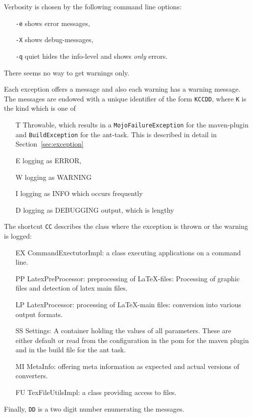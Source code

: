 Verbosity is chosen by the following command line options: 
%
\begin{itemize}
\item[\texttt{-e}] shows error messages, 
\item[\texttt{-X}] shows debug-messages, 
\item[\texttt{-q}] quiet hides the info-level and shows \emph{only} errors. 
\end{itemize}
%
There seems no way to get warnings only. 

Each exception offers a message and also each warning has a warning message. 
The messages are endowed with a unique identifier of the form 
\texttt{KCCDD}, where \texttt{K} is the kind which is one of 
%
\begin{itemize}
\item[T] Throwable, 
which results in a \texttt{MojoFailureException} for the maven-plugin 
and \texttt{BuildException} for the ant-task. 
This is described in detail in Section~\ref{sec:exception} 
\item[E] logging as ERROR, 
\item[W] logging as WARNING 
\item[I] logging as INFO which occurs frequently
\item[D] logging as DEBUGGING output, which is lengthy 
\end{itemize}

The shortcut \texttt{CC} describes the class where the exception is thrown 
or the warning is logged: 
%
\begin{itemize}
\item[EX] CommandExectutorImpl: 
a class executing applications on a command line. 
\item[PP] LatexPreProcessor: preprocessing of \LaTeX-files: 
Processing of graphic files and detection of latex main files. 
\item[LP] LatexProcessor: processing of \LaTeX-main files: 
conversion into various output formats. 
\item[SS] Settings: A container holding the values of all parameters. 
These are either default or read from the configuration 
in the pom for the maven plugin and in the build file for the ant task. 
\item[MI] MetaInfo: offering meta information
  as expected and actual versions of converters. 
\item[FU] TexFileUtilsImpl: a class providing access to files. 
\end{itemize}
%
Finally, \texttt{DD} is a two digit number enumerating the messages.


